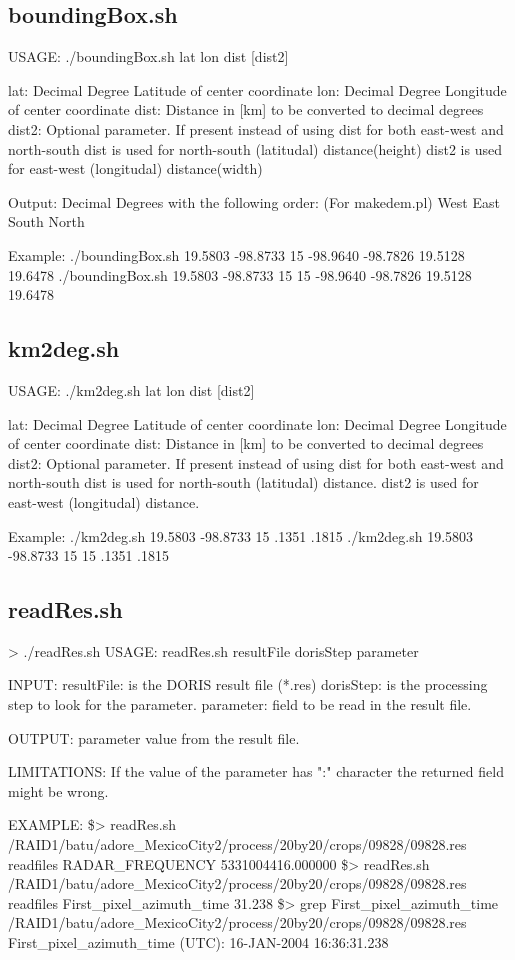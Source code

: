 \documentclass[letterpaper,10pt]{article}
\begin{document}
\subsection{boundingBox.sh}
 USAGE: ./boundingBox.sh lat lon dist [dist2]
 
 lat: Decimal Degree Latitude of center coordinate
 lon: Decimal Degree Longitude of center coordinate
 dist: Distance in [km] to be converted to decimal degrees
 dist2: Optional parameter. If present instead of using dist for both east-west and north-south
        dist is used for north-south (latitudal) distance(height)
        dist2 is used for east-west (longitudal) distance(width)
 
 Output:
 Decimal Degrees with the following order: (For makedem.pl)
 West East South North 
 
 Example:
 ./boundingBox.sh 19.5803 -98.8733 15
-98.9640 -98.7826 19.5128 19.6478
 ./boundingBox.sh 19.5803 -98.8733 15 15
-98.9640 -98.7826 19.5128 19.6478
\subsection{km2deg.sh}
 USAGE: ./km2deg.sh lat lon dist [dist2]
 
 lat: Decimal Degree Latitude of center coordinate
 lon: Decimal Degree Longitude of center coordinate
 dist: Distance in [km] to be converted to decimal degrees
 dist2: Optional parameter. If present instead of using dist for both east-west and north-south
        dist is used for north-south (latitudal) distance.
        dist2 is used for east-west (longitudal) distance.
 
 Example:
 ./km2deg.sh 19.5803 -98.8733 15
.1351 .1815
 ./km2deg.sh 19.5803 -98.8733 15 15
.1351 .1815
\subsection{readRes.sh}> ./readRes.sh 
USAGE: readRes.sh resultFile dorisStep parameter

INPUT:
  resultFile: is the DORIS result file (*.res)
  dorisStep: is the processing step to look for the parameter.
  parameter: field to be read in the result file. 

OUTPUT: 
  parameter value from the result file. 

LIMITATIONS:
If the value of the parameter has ":" character the returned field might be wrong.

EXAMPLE:
\$> readRes.sh  /RAID1/batu/adore_MexicoCity2/process/20by20/crops/09828/09828.res readfiles RADAR_FREQUENCY
5331004416.000000
\$> readRes.sh /RAID1/batu/adore_MexicoCity2/process/20by20/crops/09828/09828.res readfiles First_pixel_azimuth_time
31.238
\$> grep First_pixel_azimuth_time /RAID1/batu/adore_MexicoCity2/process/20by20/crops/09828/09828.res 
First_pixel_azimuth_time (UTC):                 16-JAN-2004 16:36:31.238
\end{document}
